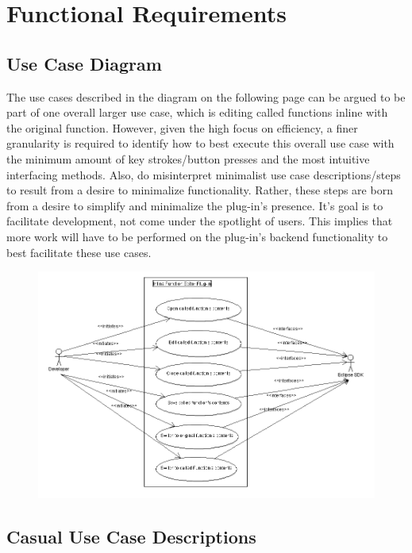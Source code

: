 \documentclass[]{report}
\begin{document}
\chapter{Functional Requirements}
	
	\section{Use Case Diagram}
	
		The use cases described in the diagram on the following page can be argued to be part of one overall larger use case, which is editing called functions inline with the original function.  However, given the high focus on efficiency, a finer granularity is required to identify how to best execute this overall use case with the minimum amount of key strokes/button presses and the most intuitive interfacing methods.  Also, do misinterpret minimalist use case descriptions/steps to result from a desire to minimalize functionality.  Rather, these steps are born from a desire to simplify and minimalize the plug-in's presence.  It's goal is to facilitate development, not come under the spotlight of users.  This implies that more work will have to be performed on the plug-in's backend functionality to best facilitate these use cases.
	
		\begin{figure}[h!]
			\centering
			\includegraphics[width=\linewidth]{imgs/use_case_diagram.png}
		\end{figure}
	
	\newpage
	
	\section{Casual Use Case Descriptions}
	
\end{document}
